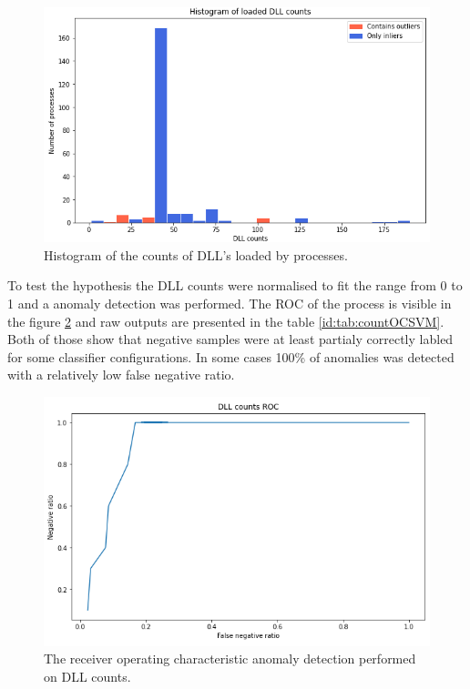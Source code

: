 \documentclass[a4paper,twoside,12pt]{book}
\begin{document}
\begin{figure}
	\centering
	\includegraphics[scale=0.9]{images/DLLcounts}
	\caption{Histogram of the counts of DLL's loaded by processes.}
	\label{fig:dllCounts}
 \end{figure}

To test the hypothesis the DLL counts were normalised to fit the range from 0 to 1 and a anomaly 
detection was performed. The ROC of the process is visible in the figure \ref{fig:DLLcountsROC} and
raw outputs are presented in the table \ref{id:tab:countOCSVM}. Both of those show that 
negative samples were at least partialy correctly labled for some classifier configurations. In 
some cases 100\% of anomalies was detected with a relatively low false negative ratio.

\begin{figure}
	\centering
	\includegraphics{images/DLLCountsROCKF}
	\caption{The receiver operating characteristic anomaly detection performed on DLL counts.}
	\label{fig:DLLcountsROC}
\end{figure}
\end{document}
